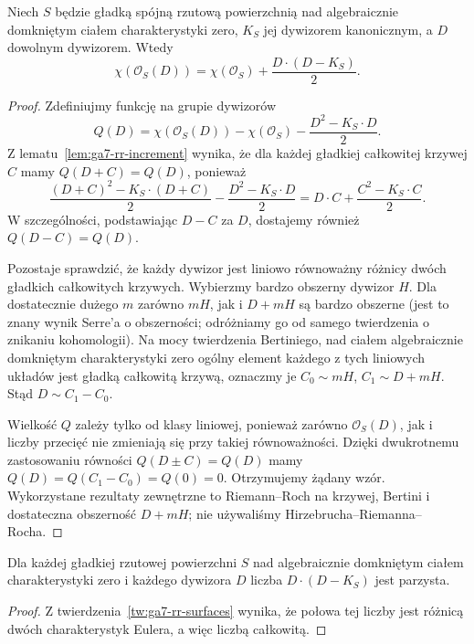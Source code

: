 \begin{twierdzenie}
\label{tw:ga7-rr-surfaces}
Niech $S$ będzie gładką spójną rzutową powierzchnią
nad algebraicznie domkniętym ciałem charakterystyki zero,
$K_S$ jej dywizorem kanonicznym, a $D$ dowolnym dywizorem.
Wtedy
\[
\chi(\mathcal O_S(D))=\chi(\mathcal O_S)
+\frac{D\cdot(D-K_S)}{2}.
\]
\end{twierdzenie}
\begin{proof}
Zdefiniujmy funkcję na grupie dywizorów
\[
Q(D)=\chi(\mathcal O_S(D))-\chi(\mathcal O_S)
-\frac{D^2-K_S\cdot D}{2}.
\]
Z lematu~\ref{lem:ga7-rr-increment} wynika, że
dla każdej gładkiej całkowitej krzywej $C$ mamy
$Q(D+C)=Q(D)$, ponieważ
\[
\frac{(D+C)^2-K_S\cdot(D+C)}{2}
-\frac{D^2-K_S\cdot D}{2}
=D\cdot C+\frac{C^2-K_S\cdot C}{2}.
\]
W szczególności, podstawiając $D-C$ za $D$,
dostajemy również $Q(D-C)=Q(D)$.

Pozostaje sprawdzić, że każdy dywizor jest liniowo
równoważny różnicy dwóch gładkich całkowitych krzywych.
Wybierzmy bardzo obszerny dywizor $H$.
Dla dostatecznie dużego $m$ zarówno $mH$,
jak i $D+mH$ są bardzo obszerne (jest to znany
wynik Serre'a o obszerności; odróżniamy go od
samego twierdzenia o znikaniu kohomologii).
Na mocy twierdzenia Bertiniego, nad ciałem
algebraicznie domkniętym charakterystyki zero
ogólny element każdego z tych liniowych układów
jest gładką całkowitą krzywą, oznaczmy je
$C_0\sim mH$, $C_1\sim D+mH$.
Stąd $D\sim C_1-C_0$.

Wielkość $Q$ zależy tylko od klasy liniowej,
ponieważ zarówno $\mathcal O_S(D)$, jak i liczby
przecięć nie zmieniają się przy takiej równoważności.
Dzięki dwukrotnemu zastosowaniu równości
$Q(D\pm C)=Q(D)$ mamy
$Q(D)=Q(C_1-C_0)=Q(0)=0$.
Otrzymujemy żądany wzór. Wykorzystane rezultaty
zewnętrzne to Riemann--Roch na krzywej,
Bertini i dostateczna obszerność $D+mH$;
nie używaliśmy Hirzebrucha--Riemanna--Rocha.
\end{proof}

\begin{wniosek}
\label{wn:ga7-parity}
Dla każdej gładkiej rzutowej powierzchni $S$ nad
algebraicznie domkniętym ciałem charakterystyki zero
i każdego dywizora $D$ liczba
$D\cdot(D-K_S)$ jest parzysta.
\end{wniosek}
\begin{proof}
Z twierdzenia~\ref{tw:ga7-rr-surfaces} wynika,
że połowa tej liczby jest różnicą dwóch
charakterystyk Eulera, a więc liczbą całkowitą.
\end{proof}

